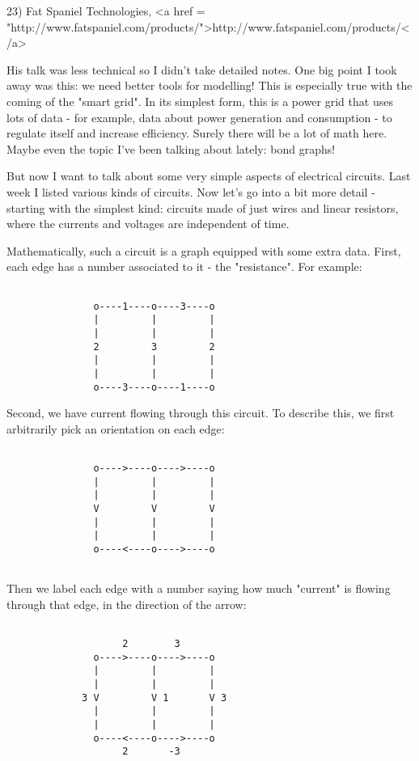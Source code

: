 23) Fat Spaniel Technologies, <a href = "http://www.fatspaniel.com/products/">http://www.fatspaniel.com/products/</a>

His talk was less technical so I didn't take detailed notes.  One big
point I took away was this: we need better tools for modelling!  This
is especially true with the coming of the "smart grid".  In its
simplest form, this is a power grid that uses lots of data - for
example, data about power generation and consumption - to regulate
itself and increase efficiency.  Surely there will be a lot of math
here.  Maybe even the topic I've been talking about lately: bond graphs!

But now I want to talk about some very simple aspects of electrical
circuits.  Last week I listed various kinds of circuits.  Now let's go
into a bit more detail - starting with the simplest kind: circuits
made of just wires and linear resistors, where the currents and
voltages are independent of time.

Mathematically, such a circuit is a graph equipped with some extra
data.  First, each edge has a number associated to it - the
"resistance".  For example:


\begin{verbatim}

               o----1----o----3----o
               |         |         | 
               |         |         | 
               2         3         2 
               |         |         | 
               |         |         | 
               o----3----o----1----o
\end{verbatim}
    
Second, we have current flowing through this circuit.  To describe this,
we first arbitrarily pick an orientation on each edge:


\begin{verbatim}

               o---->----o---->----o
               |         |         | 
               |         |         | 
               V         V         V 
               |         |         | 
               |         |         | 
               o----<----o---->----o
 
\end{verbatim}
    
Then we label each edge with a number saying how much "current"
is flowing through that edge, in the direction of the arrow:


\begin{verbatim}

                    2        3
               o---->----o---->----o
               |         |         | 
               |         |         | 
             3 V         V 1       V 3
               |         |         | 
               |         |         | 
               o----<----o---->----o
                    2       -3
\end{verbatim}
    
